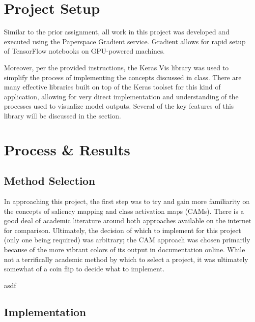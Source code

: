 \documentclass{article}
\begin{document}
  
  \graphicspath{{./images/}}

\section{Project Setup}
\par Similar to the prior assignment, all work in this project was developed and executed using the Paperspace Gradient service.
Gradient allows for rapid setup of TensorFlow notebooks on GPU-powered machines.
\par Moreover, per the provided instructions, the Keras Vis library was used to simplify the process of implementing the concepts discussed in class.
There are many effective libraries built on top of the Keras toolset for this kind of application, allowing for very direct implementation and understanding of the processes used to visualize model outputs.
Several of the key features of this library will be discussed in the  section.

\section{Process \& Results}
\subsection{Method Selection}
In approaching this project, the first step was to try and gain more familiarity on the concepts of saliency mapping and class activation maps (CAMs).
There is a good deal of academic literature around both approaches available on the internet for comparison.
Ultimately, the decision of which to implement for this project (only one being required) was arbitrary; the CAM approach was chosen primarily because of the more vibrant colors of its output in documentation online.
While not a terrifically academic method by which to select a project, it was ultimately somewhat of a coin flip to decide what to implement.

\par asdf \cite{Selvaraju2020}

\subsection{Implementation} \label{impl}
\end{document}
